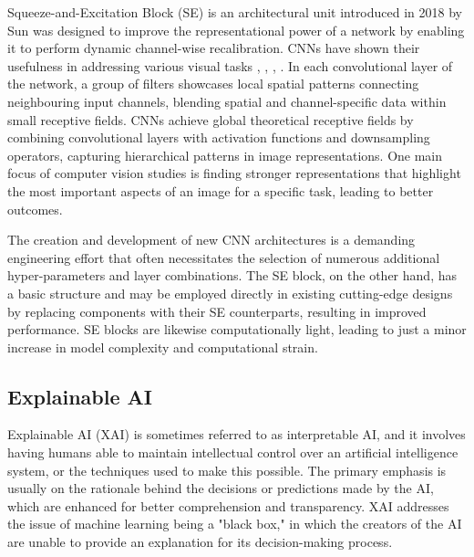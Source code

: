 Squeeze-and-Excitation Block (SE) is an architectural unit introduced in 2018 by Sun \cite{hu2018squeeze} was designed to improve the representational power of a network by enabling it to perform dynamic channel-wise recalibration. CNNs have shown their usefulness in addressing various visual tasks \cite{krizhevsky2012imagenet}, \cite{toshev2014deeppose}, \cite{long2015fully}, \cite{ren2015faster}. In each convolutional layer of the network, a group of filters showcases local spatial patterns connecting neighbouring input channels, blending spatial and channel-specific data within small receptive fields. CNNs achieve global theoretical receptive fields by combining convolutional layers with activation functions and downsampling operators, capturing hierarchical patterns in image representations. One main focus of computer vision studies is finding stronger representations that highlight the most important aspects of an image for a specific task, leading to better outcomes.

The creation and development of new CNN architectures is a demanding engineering effort that often necessitates the selection of numerous additional hyper-parameters and layer combinations. The SE block, on the other hand, has a basic structure and may be employed directly in existing cutting-edge designs by replacing components with their SE counterparts, resulting in improved performance. SE blocks are likewise computationally light, leading to just a minor increase in model complexity and computational strain.

\subsection{Explainable AI}
Explainable AI (XAI) is sometimes referred to as interpretable AI, and it involves having humans able to maintain intellectual control over an artificial intelligence system, or the techniques used to make this possible. The primary emphasis is usually on the rationale behind the decisions or predictions made by the AI, which are enhanced for better comprehension and transparency. XAI addresses the issue of machine learning being a "black box," in which the creators of the AI are unable to provide an explanation for its decision-making process.

